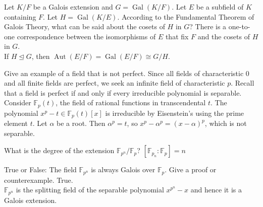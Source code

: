 \documentclass[avery5371,grid]{flashcards}
\newcommand{\F}{\mathbb{F}}
\DeclareMathOperator{\Aut}{Aut}
\DeclareMathOperator{\Gal}{Gal}
\begin{document}
\begin{flashcard}[Fields]{Let $K/F$ be a Galois extension and $G = \Gal(K/F)$. Let $E$ be a subfield of $K$ containing $F$. Let $H = \Gal(K/E)$. According to the Fundamental Theorem of Galois Theory, what can be said about the cosets of $H$ in $G$?}
 There is a one-to-one correspondence between the isomorphisms of $E$ that fix $F$ and the cosets of $H$ in $G$.\\
 
 If $H \trianglelefteq G$, then $\Aut(E/F) = \Gal(E/F) \cong G/H$.
\end{flashcard}

\begin{flashcard}[Fields]{Give an example of a field that is not perfect.}
 Since all fields of characteristic 0 and all finite fields are perfect, we seek an infinite field of characteristic $p$. Recall that a field is perfect if and only if every irreducible polynomial is separable.\\
 
 Consider $\F_p(t)$, the field of rational functions in transcendental $t$. The polynomial $x^p - t \in \F_p(t)[x]$ is irreducible by Eisenstein's using the prime element $t$. Let $\alpha$ be a root. Then $\alpha^p = t$, so $x^p - \alpha^p = (x - \alpha)^p$, which is not separable.
\end{flashcard}

\begin{flashcard}[Fields]{What is the degree of the extension $\F_{p^n}/\F_p$?}
 $[\F_{p_n}:\F_p] = n$
\end{flashcard}

\begin{flashcard}[Fields]{True or False: The field $\F_{p^n}$ is always Galois over $\F_p$. Give a proof or counterexample.}
 True. \\
 
 $\F_{p^n}$ is the splitting field of the separable polynomial $x^{p^n} - x$ and hence it is a Galois extension.
\end{flashcard}
\end{document}
